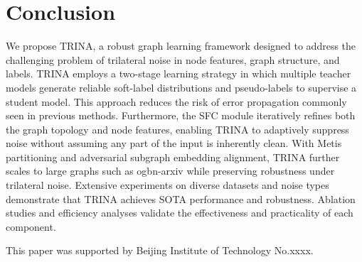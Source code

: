\documentclass[sigconf, anonymous, review]{acmart}
\begin{document}
\section{Conclusion}
  We propose TRINA, a robust graph learning framework designed to address the challenging problem of trilateral noise in node features, graph structure, and labels. TRINA employs a two-stage learning strategy in which multiple teacher models generate reliable soft-label distributions and pseudo-labels to supervise a student model. This approach reduces the risk of error propagation commonly seen in previous methods. Furthermore, the SFC module iteratively refines both the graph topology and node features, enabling TRINA to adaptively suppress noise without assuming any part of the input is inherently clean. With Metis partitioning and adversarial subgraph embedding alignment, TRINA further scales to large graphs such as ogbn-arxiv while preserving robustness under trilateral noise. Extensive experiments on diverse datasets and noise types demonstrate that TRINA achieves SOTA performance and robustness. Ablation studies and efficiency analyses validate the effectiveness and practicality of each component.

\begin{acks}
  This paper was supported by Beijing Institute of Technology No.xxxx.
\end{acks}








\appendix
\end{document}
